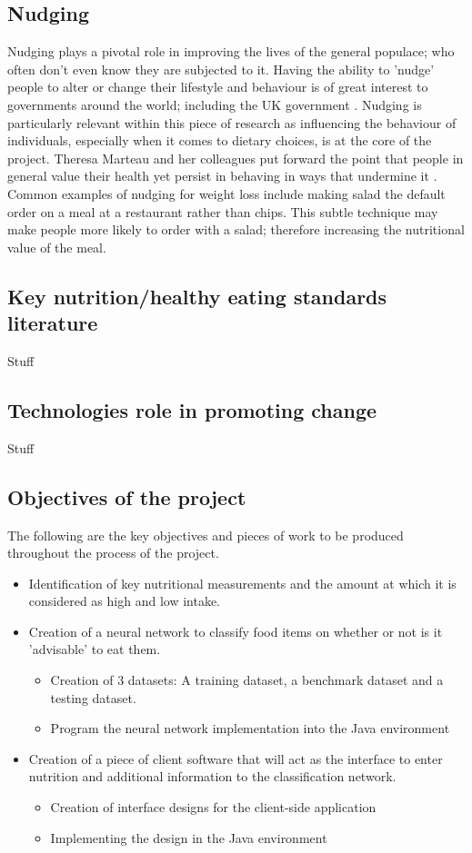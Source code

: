 \documentclass[11pt]{article}
\begin{document}
	\subsection{Nudging}
	Nudging plays a pivotal role in improving the lives of the general populace; who often don't even know they are subjected to it. Having the ability to 'nudge' people to 	alter or change their lifestyle and behaviour is of great interest to governments 			around the world; including the UK government \citep{regulating2011judging}. Nudging is particularly relevant within this piece of research as influencing the 			behaviour of individuals, especially when it comes to dietary choices, is at the core 		of the project. Theresa Marteau and her colleagues put forward the point that people in general value their health yet persist in behaving in ways that undermine it \citep{regulating2011judging}. Common examples of nudging for weight loss include making salad the default order on a meal at a restaurant rather than chips. This subtle technique may make people more likely to order with a salad; therefore increasing the nutritional value of the meal.
	\subsection{Key nutrition/healthy eating standards literature}
	Stuff
	\subsection{Technologies role in promoting change}
	Stuff
	\subsection{Objectives of the project}
	The following are the key objectives and pieces of work to be produced throughout the process of the project.
	\begin{itemize}
		\item Identification of key nutritional measurements and the amount at which it is considered as high and low intake.
		\item Creation of a neural network to classify food items on whether or not is it 'advisable' to eat them.
		\begin{itemize}
			\item Creation of 3 datasets: A training dataset, a benchmark dataset and a testing dataset.
			\item Program the neural network implementation into the Java environment 
		\end{itemize}
		\item Creation of a piece of client software that will act as the interface to enter nutrition and additional information to the classification network.
		\begin{itemize}
			\item Creation of interface designs for the client-side application
			\item Implementing the design in the Java environment
		\end{itemize}
	\end{itemize}
\pagebreak
\end{document}
